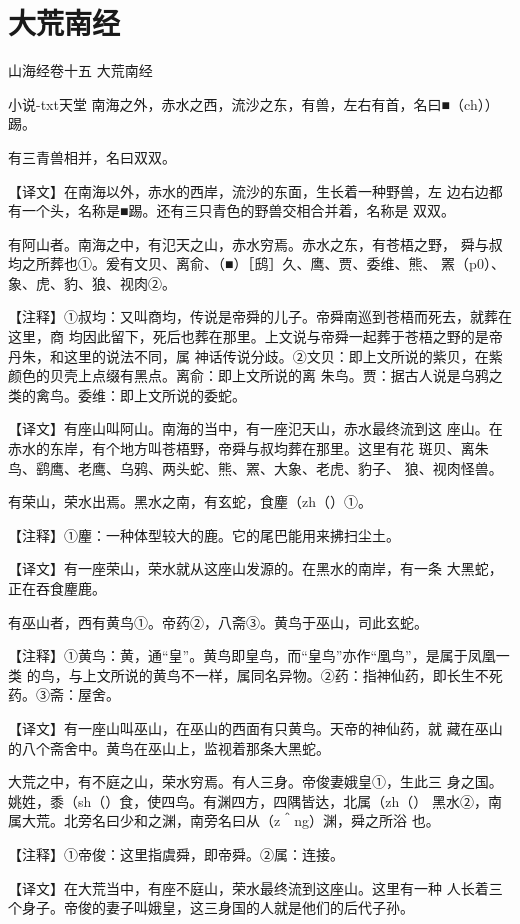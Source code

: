 \documentclass[a4paper,12pt,UTF8,twoside]{ctexbook}
\begin{document}
\chapter{大荒南经}

山海经卷十五 大荒南经

小说-txt天堂
南海之外，赤水之西，流沙之东，有兽，左右有首，名曰■（ch））踢。

有三青兽相并，名曰双双。

【译文】在南海以外，赤水的西岸，流沙的东面，生长着一种野兽，左 边右边都有一个头，名称是■踢。还有三只青色的野兽交相合并着，名称是 双双。

有阿山者。南海之中，有氾天之山，赤水穷焉。赤水之东，有苍梧之野， 舜与叔均之所葬也①。爰有文贝、离俞、（■）［鸱］久、鹰、贾、委维、熊、 罴（p0）、象、虎、豹、狼、视肉②。

【注释】①叔均：又叫商均，传说是帝舜的儿子。帝舜南巡到苍梧而死去，就葬在这里，商 均因此留下，死后也葬在那里。上文说与帝舜一起葬于苍梧之野的是帝丹朱，和这里的说法不同，属 神话传说分歧。②文贝：即上文所说的紫贝，在紫颜色的贝壳上点缀有黑点。离俞：即上文所说的离 朱鸟。贾：据古人说是乌鸦之类的禽鸟。委维：即上文所说的委蛇。

【译文】有座山叫阿山。南海的当中，有一座氾天山，赤水最终流到这 座山。在赤水的东岸，有个地方叫苍梧野，帝舜与叔均葬在那里。这里有花 斑贝、离朱鸟、鹞鹰、老鹰、乌鸦、两头蛇、熊、罴、大象、老虎、豹子、 狼、视肉怪兽。

有荣山，荣水出焉。黑水之南，有玄蛇，食麈（zh（）①。

【注释】①麈：一种体型较大的鹿。它的尾巴能用来拂扫尘土。

【译文】有一座荣山，荣水就从这座山发源的。在黑水的南岸，有一条 大黑蛇，正在吞食麈鹿。

有巫山者，西有黄鸟①。帝药②，八斋③。黄鸟于巫山，司此玄蛇。

【注释】①黄鸟：黄，通“皇”。黄鸟即皇鸟，而“皇鸟”亦作“凰鸟”，是属于凤凰一类 的鸟，与上文所说的黄鸟不一样，属同名异物。②药：指神仙药，即长生不死药。③斋：屋舍。

【译文】有一座山叫巫山，在巫山的西面有只黄鸟。天帝的神仙药，就 藏在巫山的八个斋舍中。黄鸟在巫山上，监视着那条大黑蛇。

大荒之中，有不庭之山，荣水穷焉。有人三身。帝俊妻娥皇①，生此三 身之国。姚姓，黍（sh（）食，使四鸟。有渊四方，四隅皆达，北属（zh（） 黑水②，南属大荒。北旁名曰少和之渊，南旁名曰从（z＾ng）渊，舜之所浴 也。

【注释】①帝俊：这里指虞舜，即帝舜。②属：连接。

【译文】在大荒当中，有座不庭山，荣水最终流到这座山。这里有一种 人长着三个身子。帝俊的妻子叫娥皇，这三身国的人就是他们的后代子孙。
\end{document}
